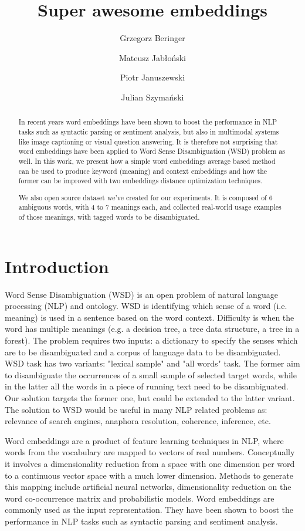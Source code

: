 \documentclass{llncs}
\title{Super awesome embeddings}
\author{Grzegorz Beringer \and Mateusz Jabłoński \and Piotr Januszewski \and Julian Szymański}
\institute{
Faculty of Electronic Telecommunications and Informatics\\
Gda{\'n}sk University of Technology, Gda{\'n}sk, Poland
}
\begin{document}
\maketitle
\begin{abstract}

In recent years word embeddings have been shown to boost the performance in NLP tasks such as syntactic parsing or sentiment analysis, but also in multimodal systems like image captioning or visual question answering. It is therefore not surprising that word embeddings have been applied to Word Sense Disambiguation (WSD) problem as well. In this work, we present how a simple word embeddings average based method can be used to produce keyword (meaning) and context embeddings and how the former can be improved with two embeddings distance optimization techniques.

We also open source dataset we've created for our experiments. It is composed of 6 ambiguous words, with 4 to 7 meanings each, and collected real-world usage examples of those meanings, with tagged words to be disambiguated.

\end{abstract}

\section{Introduction}
\label{introduction}

Word Sense Disambiguation (WSD) is an open problem of natural language processing (NLP) and ontology. WSD is identifying which sense of a word (i.e. meaning) is used in a sentence based on the word context. Difficulty is when the word has multiple meanings (e.g. a decision tree, a tree data structure, a tree in a forest). The problem requires two inputs: a dictionary to specify the senses which are to be disambiguated and a corpus of language data to be disambiguated. WSD task has two variants: "lexical sample" and "all words" task. The former aim to disambiguate the occurrences of a small sample of selected target words, while in the latter all the words in a piece of running text need to be disambiguated. Our solution targets the former one, but could be extended to the latter variant.
The solution to WSD would be useful in many NLP related problems as: relevance of search engines, anaphora resolution, coherence, inference, etc.

Word embeddings are a product of feature learning techniques in NLP, where words from the vocabulary are mapped to vectors of real numbers. Conceptually it involves a dimensionality reduction from a space with one dimension per word to a continuous vector space with a much lower dimension.
Methods to generate this mapping include artificial neural networks\cite{word2vec}\cite{GloVe}\cite{fastText}, dimensionality reduction on the word co-occurrence matrix\cite{Levy2014NWE} and probabilistic models\cite{Globerson2007EEC}.
Word embeddings are commonly used as the input representation. They have been shown to boost the performance in NLP tasks such as syntactic parsing\cite{parsingGrammars} and sentiment analysis\cite{sentimentAnalysis}.
\end{document}
